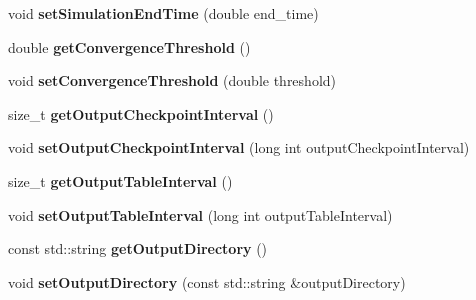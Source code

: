 \begin{DoxyCompactItemize}
\item 
\hypertarget{classnatrium_1_1SolverConfiguration_a0d64bd79313ae1aa022d9a2c0e6bc3fd}{
void {\bfseries setSimulationEndTime} (double end\_\-time)}
\label{classnatrium_1_1SolverConfiguration_a0d64bd79313ae1aa022d9a2c0e6bc3fd}

\item 
\hypertarget{classnatrium_1_1SolverConfiguration_a221b5a32cb4cc871536f68a26e14b3c8}{
double {\bfseries getConvergenceThreshold} ()}
\label{classnatrium_1_1SolverConfiguration_a221b5a32cb4cc871536f68a26e14b3c8}

\item 
\hypertarget{classnatrium_1_1SolverConfiguration_a8e7af89ae281933e0f70771ef09147b0}{
void {\bfseries setConvergenceThreshold} (double threshold)}
\label{classnatrium_1_1SolverConfiguration_a8e7af89ae281933e0f70771ef09147b0}

\item 
\hypertarget{classnatrium_1_1SolverConfiguration_a7b7ffc9156ba827ab74ff6f1d7bd9151}{
size\_\-t {\bfseries getOutputCheckpointInterval} ()}
\label{classnatrium_1_1SolverConfiguration_a7b7ffc9156ba827ab74ff6f1d7bd9151}

\item 
\hypertarget{classnatrium_1_1SolverConfiguration_ab7a39dfb46cb1b0c7b54b92700fd7360}{
void {\bfseries setOutputCheckpointInterval} (long int outputCheckpointInterval)}
\label{classnatrium_1_1SolverConfiguration_ab7a39dfb46cb1b0c7b54b92700fd7360}

\item 
\hypertarget{classnatrium_1_1SolverConfiguration_a6c0fb63902a6828c06c48918402375bb}{
size\_\-t {\bfseries getOutputTableInterval} ()}
\label{classnatrium_1_1SolverConfiguration_a6c0fb63902a6828c06c48918402375bb}

\item 
\hypertarget{classnatrium_1_1SolverConfiguration_a207c38e009015be45e74eaa86f9db7ad}{
void {\bfseries setOutputTableInterval} (long int outputTableInterval)}
\label{classnatrium_1_1SolverConfiguration_a207c38e009015be45e74eaa86f9db7ad}

\item 
\hypertarget{classnatrium_1_1SolverConfiguration_a2a0444878a5fb512772e024bc03ec076}{
const std::string {\bfseries getOutputDirectory} ()}
\label{classnatrium_1_1SolverConfiguration_a2a0444878a5fb512772e024bc03ec076}

\item 
\hypertarget{classnatrium_1_1SolverConfiguration_acd249488bb83773514c4d6917b5bfc3a}{
void {\bfseries setOutputDirectory} (const std::string \&outputDirectory)}
\label{classnatrium_1_1SolverConfiguration_acd249488bb83773514c4d6917b5bfc3a}


\end{DoxyCompactItemize}
